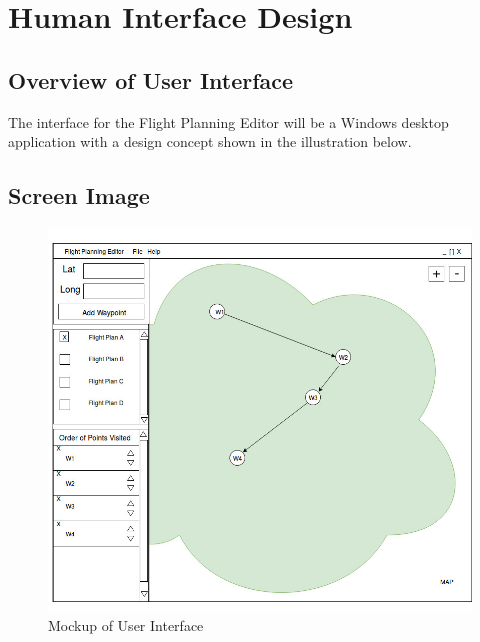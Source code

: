 \documentclass[12pt, letterpaper]{article}
\begin{document}
\section{Human Interface Design} \label{sec:ui}

\subsection{Overview of User Interface}
The interface for the Flight Planning Editor will be a Windows desktop application with a design concept shown in the illustration below.
	\subsection{Screen Image}
    \begin{figure}[h!]
      \includegraphics[width=0.95\linewidth]{figs/FlightPlanning_Interface}\caption{Mockup of User Interface}
    \end{figure}
\end{document}
